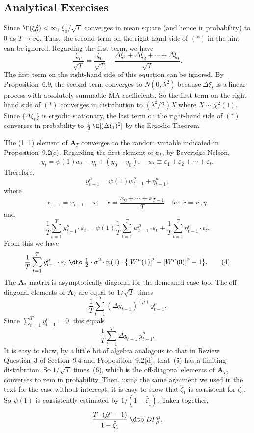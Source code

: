 \begin{answers}

\subsection*{Analytical Exercises}

Since $\E(\xi_0^2) < \infty$, $\xi_0/\sqrt{T}$ converges in mean square (and hence in probability)
to 0 as $T \to \infty$. Thus, the second term on the right-hand side of $(*)$ in the hint
can be ignored. Regarding the first term, we have
\[
\frac{\xi_T}{\sqrt{T}} = \frac{\xi_0}{\sqrt{T}}
+ \frac{\Delta\xi_1 + \Delta\xi_2 + \cdots + \Delta\xi_T}{\sqrt{T}}.
\]
The first term on the right-hand side of this equation can be ignored. By
Proposition~6.9, the second term converges to $N(0, \lambda^2)$ because $\Delta\xi_t$ is a linear
process with absolutely summable MA coefficients. So the first term on the
right-hand side of $(*)$ converges in distribution to $(\lambda^2/2)X$ where $X \sim \chi^2(1)$.
Since $\{\Delta\xi_t\}$ is ergodic stationary, the last term on the right-hand side of $(*)$
converges in probability to $\tfrac{1}{2}\,\E[(\Delta\xi_t)^2]$ by the Ergodic Theorem.

The (1, 1) element of $\mathbf{A}_T$ converges to the random variable indicated in Proposition~9.2(c). Regarding the first element of $\mathbf{c}_T$, by Beveridge-Nelson,
\[
y_t = \psi(1)w_t + \eta_t + (y_0 - \eta_0), \quad w_t \equiv \varepsilon_1 + \varepsilon_2 + \cdots + \varepsilon_t.
\tag{1}
\]
Therefore,
\[
y_{t-1}^\mu = \psi(1) w_{t-1}^\mu + \eta_{t-1}^\mu,
\tag{2}
\]
where
\[
x_{t-1} = x_{t-1} - \bar{x}, \quad
\bar{x} = \frac{x_0 + \cdots + x_{T-1}}{T}
\quad \text{for } x = w, \eta.
\]
and
\[
\frac{1}{T}\sum_{t=1}^{T} y_{t-1}^\mu \cdot \varepsilon_t
= \psi(1)\frac{1}{T}\sum_{t=1}^{T} w_{t-1}^\mu \cdot \varepsilon_t
+ \frac{1}{T}\sum_{t=1}^{T}\eta_{t-1}^\mu \cdot \varepsilon_t.
\tag{3}
\]
From this we have
\[
\frac{1}{T}\sum_{t=1}^{T} y_{t-1}^\mu \cdot \varepsilon_t
\;\dto\; \tfrac{1}{2}\cdot\sigma^2 \cdot \psi(1) \cdot
\big\{[W^\mu(1)]^2 - [W^\mu(0)]^2 - 1\big\}.
\tag{4}
\]
The $\mathbf{A}_T$ matrix is asymptotically diagonal for the demeaned case too. The off-diagonal elements of $\mathbf{A}_T$ are equal to $1/\sqrt{T}$ times
\[
\frac{1}{T}\sum_{t=1}^{T}(\Delta y_{t-1})^{(\mu)}\, y_{t-1}^\mu.
\tag{5}
\]
Since $\sum_{t=1}^{T} y_{t-1}^\mu = 0$, this equals
\[
\frac{1}{T}\sum_{t=1}^{T}\Delta y_{t-1}\, y_{t-1}^\mu.
\tag{6}
\]
It is easy to show, by a little bit of algebra analogous to that in Review Question~3 of Section~9.4 and Proposition~9.2(d), that~(6) has a limiting distribution. So
$1/\sqrt{T}$ times~(6), which is the off-diagonal elements of $\mathbf{A}_T$, converges to zero
in probability. Then, using the same argument we used in the text for the case
without intercept, it is easy to show that $\hat{\zeta}_1$ is consistent for $\zeta_1$. So $\psi(1)$ is
consistently estimated by $1/(1 - \hat{\zeta}_1)$. Taken together,
\[
\frac{T \cdot (\hat{\rho}^\mu - 1)}{1 - \hat{\zeta}_1}
\;\dto\; DF_\rho^\mu.
\]


\end{answers}

